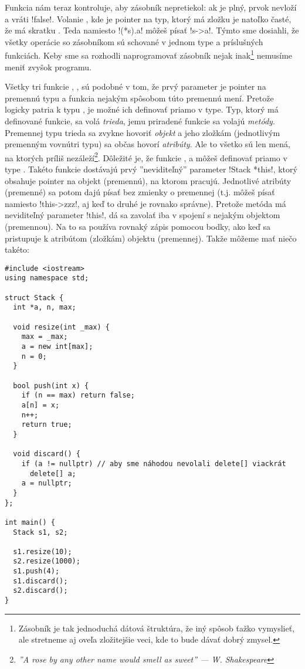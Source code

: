  Funkcia  nám teraz kontroluje, aby zásobník nepretiekol: ak je plný, 
prvok nevloží a vráti \prg!false!.
Volanie , kde  je pointer na typ, ktorý má zložku  je natoľko %
časté, že má skratku . Teda namiesto \prg!(*s).a! môžeš písať \prg!s->a!.
Týmto sme dosiahli, že všetky operácie so zásobníkom sú schované v jednom type a príslušných
funkciách. Keby sme sa rozhodli naprogramovať zásobník nejak inak\footnote{%
  Zásobník je tak jednoduchá dátová štruktúra, že iný spôsob ťažko vymyslieť, ale 
  stretneme aj oveľa zložitejšie veci, kde to bude dávať dobrý zmysel.}
nemusíme meniť zvyšok programu. 



Všetky tri funkcie , ,  sú podobné v tom, že prvý
parameter je pointer na premennú typu  a funkcia nejakým spôsobom túto premennú 
mení. Pretože logicky patria k typu , je možné ich definovať priamo v type.
Typ, ktorý má definované funkcie, sa volá {\em trieda}, jemu priradené funkcie sa volajú
{\em metódy}. Premennej typu trieda sa zvykne hovoriť {\em objekt} a jeho zložkám 
(jednotlivým premenným vovnútri typu) sa občas hovorí {\em atribúty}. Ale to všetko sú
len mená, na ktorých príliš nezáleží\footnote{{\em ''A rose by any other name would 
smell as sweet'' --- W. Shakespeare}}. Dôležité je, že funkcie , 
a  môžeš definovať priamo v type . Takéto funkcie
dostávajú prvý ''neviditeľný'' parameter \prg!Stack *this!, ktorý obsahuje pointer
na objekt (premennú), na ktorom pracujú. Jednotlivé atribúty (premenné) sa potom
dajú písať bez zmienky o premennej (t.j. môžeš písať  namiesto \prg!this->zzz!, 
aj keď to druhé je rovnako správne). Pretože metóda má neviditeľný parameter \prg!this!,
dá sa zavolať iba v spojení s nejakým objektom (premennou).  Na to sa používa rovnaký zápis
pomocou bodky, ako keď sa pristupuje k atribútom (zložkám) objektu (premennej). 
Takže môžeme mať niečo takéto:

\begin{lstlisting}[] 
#include <iostream>
using namespace std;

struct Stack {
  int *a, n, max;

  void resize(int _max) {
    max = _max;
    a = new int[max];
    n = 0;
  }

  bool push(int x) {
    if (n == max) return false;
    a[n] = x;
    n++;
    return true;
  }

  void discard() {
    if (a != nullptr) // aby sme náhodou nevolali delete[] viackrát
      delete[] a;
    a = nullptr;
  }
};

int main() {
  Stack s1, s2;

  s1.resize(10);
  s2.resize(1000);
  s1.push(4);
  s1.discard();
  s2.discard();
}
\end{lstlisting}

